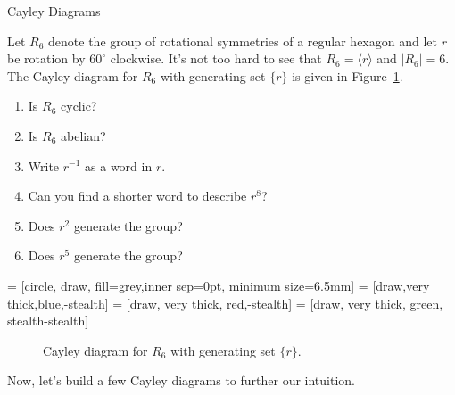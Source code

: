 \begin{section}{Cayley Diagrams}
\begin{problem}\label{prob:introducing_R6}
Let $R_6$ denote the group of rotational symmetries of a regular hexagon and let $r$ be rotation by $60^{\circ}$ clockwise. It's not too hard to see that $R_6=\langle r\rangle$ and $|R_6|=6$.  The Cayley diagram for $R_6$ with generating set $\{r\}$ is given in Figure~\ref{fig:rotation6}. 
\begin{enumerate}[label=\rm{(\alph*)}]
\item Is $R_6$ cyclic?
\item Is $R_6$ abelian?
\item Write $r^{-1}$ as a word in $r$.
\item Can you find a shorter word to describe $r^8$?
\item Does $r^2$ generate the group?
\item Does $r^5$ generate the group?
\end{enumerate}
\end{problem}

 = [circle, draw, fill=grey,inner sep=0pt, minimum size=6.5mm]
 = [draw,very thick,blue,-stealth]
 = [draw, very thick, red,-stealth]
 = [draw, very thick, green, stealth-stealth]

\begin{figure}[!ht]
\centering
{}
\caption{Cayley diagram for $R_6$ with generating set $\{r\}$.}
\label{fig:rotation6}
\end{figure}
 
Now, let's build a few Cayley diagrams to further our intuition.


\end{section}
